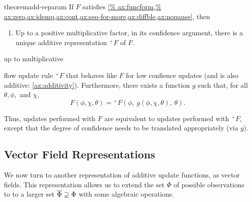\begin{linked}{theorem}{add-reparam}
	If $F$ satisfies \cref{%
		ax:funcform,%
		ax:zero,ax:idemp,ax:cont,ax:seq-for-more,ax:diffble,ax:nopause},
	then
	\begin{enumerate}
		\item Up to a positive multiplicative factor, in its confidence
		argument, there is a unique additive representation
		$^+\!F$ of $F$. 
	\end{enumerate}
	
	up to multiplicative 
	
	flow update rule
	 $^+\!F$
	that behaves like $F$ for low confience updates
	(and is also additive: \cref{ax:additivity}). 
	Furthermore, there exists a function 
	$g$ such that,
	for all $\theta,\phi,$ and $\chi$,
	\[
		F( \phi, 
			\chi,
		 \theta )
		 =
		{^+}\!F(\phi,~ 
		g(\phi,\chi,\theta),~
		 \theta).
	\]
\end{linked}
Thus, updates performed with $F$ are equivalent
to updates performed with ${^+}\!F$, except that
the degree of confidence needs to be translated appropriately (via $g$).





% 


\subsection{Vector Field Representations}
\label{sec:vecrep}

We now turn to another representation of additive 
update functions, as vector fields. 
This representation allows us to extend the set $\Phi$ of possible observations to 
to a larger set $\overline \Phi \supseteq \Phi$ with some algebraic operations.  


